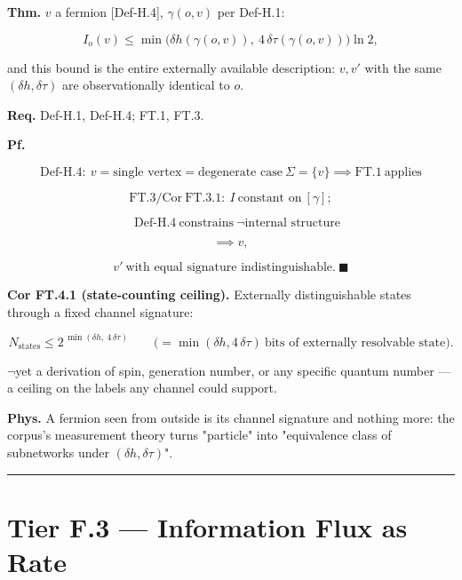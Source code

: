 \begin{theorem}\label{tag:FT-4}
\textbf{Thm.} $v$ a fermion [Def-H.4], $\gamma(o,v)$ per Def-H.1:

\[
I_o(v)\le\min\bigl(\delta h(\gamma(o,v)),\ 4\,\delta\tau(\gamma(o,v))\bigr)\ln2,
\]

and this bound is the entire externally available description: $v,v'$ with the same $(\delta h,\delta\tau)$ are observationally identical to $o$.

\textbf{Req.} Def-H.1, Def-H.4; FT.1, FT.3.

\textbf{Pf.}

\[
\mathrm{Def\text{-}H.4}:\ v=\text{single vertex}=\text{degenerate case}\ \Sigma=\{v\}\implies\mathrm{FT.1}\ \text{applies}
\]

\[
\mathrm{FT.3}/\mathrm{Cor\ FT.3.1}:\ I\ \text{constant on}\ [\gamma];
\]

\[
\quad\mathrm{Def\text{-}H.4}\ \text{constrains}\ \neg\text{internal structure}
\]

\[
\implies v,
\]

\[
v'\ \text{with equal signature indistinguishable}.\ \blacksquare
\]

\textbf{Cor FT.4.1 (state-counting ceiling).} Externally distinguishable states through a fixed channel signature:

\[
N_{\mathrm{states}}\le2^{\,\min(\delta h,\ 4\,\delta\tau)}\qquad\bigl(=\min(\delta h,4\,\delta\tau)\ \text{bits of externally resolvable state}\bigr).
\]

$\neg$yet a derivation of spin, generation number, or any specific quantum number — a ceiling on the labels any channel could support.

\textbf{Phys.} A fermion seen from outside is its channel signature and nothing more: the corpus's measurement theory turns "particle" into "equivalence class of subnetworks under $(\delta h,\delta\tau)$".

\vspace{2pt}\noindent\rule{\textwidth}{0.4pt}\vspace{2pt}

\end{theorem}

\section[Tier F.3 — Information Flux as Rate]{\texorpdfstring{Tier F.3 — Information Flux as Rate}{Tier F.3 - Information Flux as Rate}}

